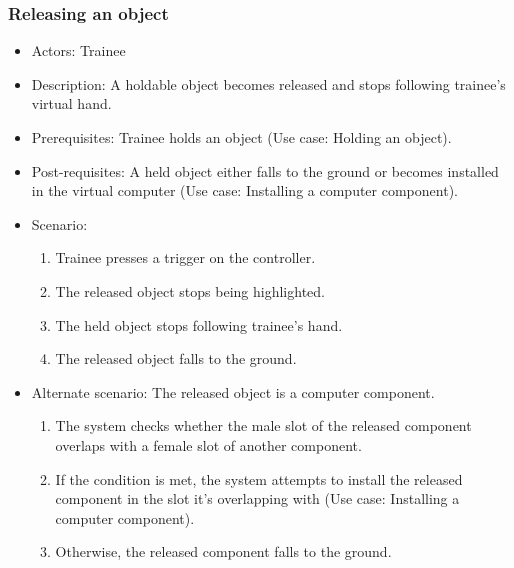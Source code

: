 \subsubsection{Releasing an object}
\begin{itemize}
\item Actors: Trainee
\item Description: A holdable object becomes released and stops following trainee's virtual hand.
\item Prerequisites: Trainee holds an object (Use case: Holding an object).
\item Post-requisites: A held object either falls to the ground or becomes installed in the virtual computer (Use case: Installing a computer component).
\item Scenario: 
\begin{enumerate}
    \item Trainee presses a trigger on the controller.
    \item The released object stops being highlighted.
    \item The held object stops following trainee's hand.
    \item The released object falls to the ground.
\end{enumerate}
\item Alternate scenario: The released object is a computer component.
\begin{enumerate}
    \item The system checks whether the male slot of the released component overlaps with a female slot of another component.
    \item If the condition is met, the system attempts to install the released component in the slot it's overlapping with (Use case: Installing a computer component).
    \item Otherwise, the released component falls to the ground.
\end{enumerate}
\end{itemize}

